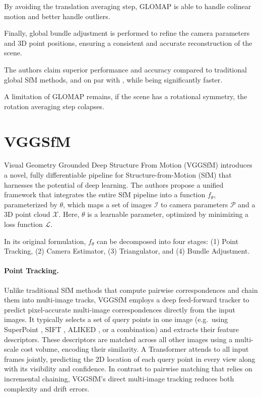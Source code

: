 By avoiding the translation averaging step, GLOMAP is able to handle colinear motion and better handle outliers.

Finally, global bundle adjustment is performed to refine the camera parameters and 3D point positions, ensuring a consistent and accurate reconstruction of the scene.

The authors claim superior performance and accuracy compared to traditional global SfM methods, and on par with , while being significantly faster.

A limitation of GLOMAP remains, if the scene has a rotational symmetry, the rotation averaging step colapses.

\section{VGGSfM}\label{sec:vggsfm}

Visual Geometry Grounded Deep Structure From Motion (VGGSfM) \cite{wang2023vggsfm} introduces a novel, fully differentiable pipeline for Structure-from-Motion (SfM) that harnesses the potential of deep learning. The authors propose a unified framework that integrates the entire SfM pipeline into a function $f_{\theta}$, parameterized by $\theta$, which maps a set of images $\mathcal{I}$ to camera parameters $\mathcal{P}$ and a 3D point cloud $\mathcal{X}$. Here, $\theta$ is a learnable parameter, optimized by minimizing a loss function $\mathcal{L}$.

In its original formulation, $f_\theta$ can be decomposed into four stages: (1) Point Tracking, (2) Camera Estimator, (3) Triangulator, and (4) Bundle Adjustment.

\paragraph{Point Tracking.}
Unlike traditional SfM methods that compute pairwise correspondences and chain them into multi-image tracks, VGGSfM employs a deep feed-forward tracker to predict pixel-accurate multi-image correspondences directly from the input images. 
It typically selects a set of query points in one image (e.g.\ using SuperPoint \cite{detone18superpoint}, SIFT \cite{Lowe2004DistinctiveIF}, ALIKED \cite{Zhao2023ALIKED}, or a combination) and extracts their feature descriptors. These descriptors are matched across all other images using a multi-scale cost volume, encoding their similarity. 
A Transformer attends to all input frames jointly, predicting the 2D location of each query point in every view along with its visibility and confidence. 
In contrast to pairwise matching that relies on incremental chaining, VGGSfM's direct multi-image tracking reduces both complexity and drift errors.

